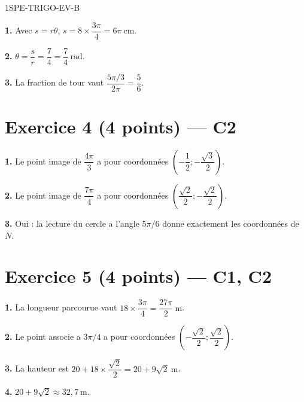\begin{corrige}{1SPE-TRIGO-EV-B}

\textbf{1.} Avec $s=r\theta$, $s=8\times\dfrac{3\pi}{4}=\boxed{6\pi\ \text{cm}}$.

\textbf{2.} $\theta=\dfrac{s}{r}=\dfrac74=\boxed{\dfrac74\ \text{rad}}$.

\textbf{3.} La fraction de tour vaut $\dfrac{5\pi/3}{2\pi}=\boxed{\dfrac56}$.

\section*{Exercice 4 \hfill (4 points) — C2}


\textbf{1.} Le point image de $\dfrac{4\pi}{3}$ a pour coordonnées $\boxed{\left(-\dfrac12;-\dfrac{\sqrt3}{2}\right)}$.

\textbf{2.} Le point image de $\dfrac{7\pi}{4}$ a pour coordonnées $\boxed{\left(\dfrac{\sqrt2}{2};-\dfrac{\sqrt2}{2}\right)}$.

\textbf{3.} Oui : la lecture du cercle a l'angle $5\pi/6$ donne exactement les coordonnées de $N$.

\section*{Exercice 5 \hfill (4 points) — C1, C2}


\textbf{1.} La longueur parcourue vaut $18\times\dfrac{3\pi}{4}=\boxed{\dfrac{27\pi}{2}\ \text{m}}$.

\textbf{2.} Le point associe a $3\pi/4$ a pour coordonnées $\boxed{\left(-\dfrac{\sqrt2}{2};\dfrac{\sqrt2}{2}\right)}$.

\textbf{3.} La hauteur est $\boxed{20+18\times\dfrac{\sqrt2}{2}=20+9\sqrt2\ \text{m}}$.

\textbf{4.} $20+9\sqrt2\approx\boxed{32{,}7\ \text{m}}$.

\end{corrige}

